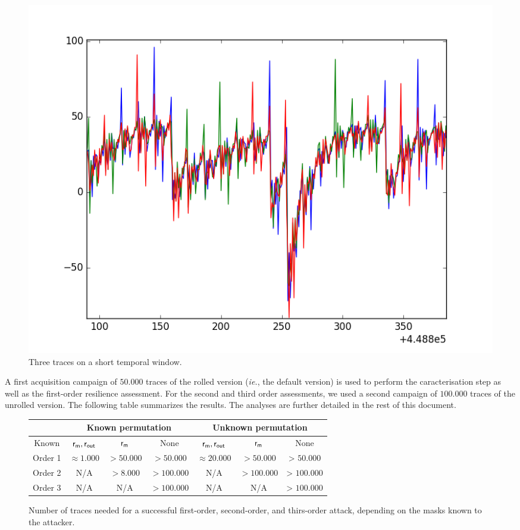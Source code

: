 \begin{figure}[h]
	\centering 
	\includegraphics[scale=0.35]{figures/3_traces.png}
	\caption{Three traces on a short temporal window.}
	\label{fig:3_traces}
\end{figure}


A first acquisition campaign of $50.000$ traces of the rolled version (\emph{ie.}, the default version) is used to perform the caracterisation step as well as the first-order resilience assessment.
For the second and third order assessments, we used a second campaign of $100.000$ traces of the unrolled version. The following table summarizes the results.
The analyses are further detailed in the rest of this document.

\begin{figure}[h!]
\centering
\begin{tabular}{|c|c|c|c|c|c|c|}
  \hline
   & \multicolumn{3}{c|}{Known permutation}&\multicolumn{3}{c|}{Unknown permutation}\\
  \hline
  Known    & $\mathsf{r_m}, \mathsf{r_{out}}$ & $\mathsf{r_m} $ &  None & $\mathsf{r_m},\mathsf{r_{out}}$ & $\mathsf{r_m} $  &  None \\
  \hline
  Order 1& $\approx 1.000$ & $ > 50.000$ & $> 50.000$& $\approx 20.000$ & $ > 50.000$ & > $50.000$\\
  \hline
  Order 2& N/A & $ > 8.000$ & $> 100.000$& N/A & $ > 100.000$ & > $100.000$\\
  \hline
  Order 3& N/A & N/A & $> 100.000$& N/A & N/A & > $100.000$\\
  \hline
\end{tabular}
\caption{Number of traces needed for a successful first-order, second-order, and thirs-order attack, depending on the masks known to the attacker.}
\end{figure}


